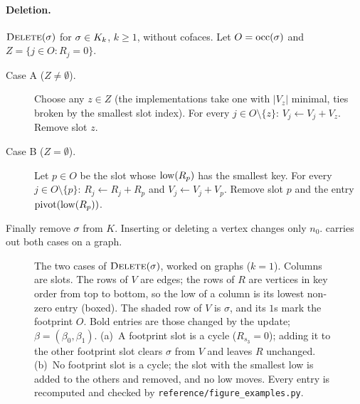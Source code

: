 \paragraph{Deletion.} $\textup{\textsc{Delete}}(\sigma)$ for $\sigma\in K_{k}$, $k\ge1$, without
cofaces. Let $O=\operatorname{occ}(\sigma)$ and $Z=\{j\in O: R_j=0\}$.
\begin{description}
\item[Case A ($Z\ne\emptyset$).] Choose any $z\in Z$ (the implementations take
  one with $|V_z|$ minimal, ties broken by the smallest slot index). For every $j\in O\setminus\{z\}$:
  $V_j\gets V_j+V_z$. Remove slot $z$.
\item[Case B ($Z=\emptyset$).] Let $p\in O$ be the slot whose $\operatorname{low}(R_p)$ has
  the smallest key. For every $j\in O\setminus\{p\}$: $R_j\gets R_j+R_p$ and
  $V_j\gets V_j+V_p$. Remove slot $p$ and the entry $\operatorname{pivot}(\operatorname{low}(R_p))$.
\end{description}
Finally remove $\sigma$ from $K$. Inserting or deleting a vertex changes only
$n_0$.  carries out both cases on a graph.

\begin{figure}[t]
\centering

\caption{The two cases of $\textup{\textsc{Delete}}(\sigma)$, worked on graphs ($k=1$). Columns are
slots. The rows of $V$ are edges; the rows of $R$ are vertices in key order from
top to bottom, so the low of a column is its lowest non-zero entry (boxed). The
shaded row of $V$ is $\sigma$, and its $1$s mark the footprint $O$. Bold entries
are those changed by the update; $\beta=(\beta_0,\beta_1)$.
(a)~A footprint slot is a cycle ($R_{s_3}=0$); adding it to the other footprint
slot clears $\sigma$ from $V$ and leaves $R$ unchanged.
(b)~No footprint slot is a cycle; the slot with the smallest low is added to the
others and removed, and no low moves.
Every entry is recomputed and checked by \texttt{reference/figure\_examples.py}.}
\label{fig:deletion}
\end{figure}

